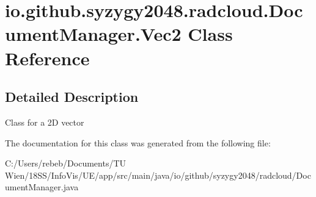 \hypertarget{classio_1_1github_1_1syzygy2048_1_1radcloud_1_1_document_manager_1_1_vec2}{}\section{io.\+github.\+syzygy2048.\+radcloud.\+Document\+Manager.\+Vec2 Class Reference}
\label{classio_1_1github_1_1syzygy2048_1_1radcloud_1_1_document_manager_1_1_vec2}


\subsection{Detailed Description}
Class for a 2D vector 

The documentation for this class was generated from the following file\+:\begin{DoxyCompactItemize}
\item 
C\+:/\+Users/rebeb/\+Documents/\+T\+U Wien/18\+S\+S/\+Info\+Vis/\+U\+E/app/src/main/java/io/github/syzygy2048/radcloud/Document\+Manager.\+java\end{DoxyCompactItemize}
